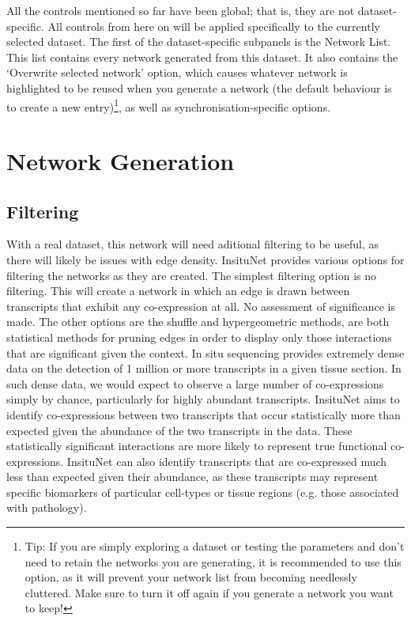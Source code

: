\documentclass[a4paper,12pt]{article}
\begin{document}
All the controls mentioned so far have been global; that is, they are not dataset-specific. All controls from here on will be applied specifically to the currently selected dataset. The first of the dataset-specific subpanels is the Network List. This list contains every network generated from this dataset. It also contains the `Overwrite selected network' option, which causes whatever network is highlighted to be reused when you generate a network (the default behaviour is to create a new entry)\footnote{Tip: If you are simply exploring a dataset or testing the parameters and don't need to retain the networks you are generating, it is recommended to use this option, as it will prevent your network list from becoming needlessly cluttered. Make sure to turn it off again if you generate a network you want to keep!}, as well as synchronisation-specific options.

\section{Network Generation}

\subsection{Filtering}
With a real dataset, this network will need aditional filtering to be useful, as there will likely be issues with edge density. InsituNet provides various options for filtering the networks as they are created. The simplest filtering option is no filtering. This will create a network in which an edge is drawn between transcripts that exhibit any co-expression at all. No assessment of significance is made. The other options are the shuffle and hypergeometric methods, are both statistical methods for pruning edges in order to display only those interactions that are significant given the context.
In situ sequencing provides extremely dense data on the detection of 1 million or more transcripts in a given tissue section. In such dense data, we would expect to observe a large number of co-expressions simply by chance, particularly for highly abundant transcripts. InsituNet aims to identify co-expressions between two transcripts that occur statistically more than expected given the abundance of the two transcripts in the data. These statistically significant interactions are more likely to represent true functional co-expressions. InsituNet can also identify transcripts that are co-expressed much less than expected given their abundance, as these transcripts may represent specific biomarkers of particular cell-types or tissue regions (e.g. those associated with pathology).
\end{document}
